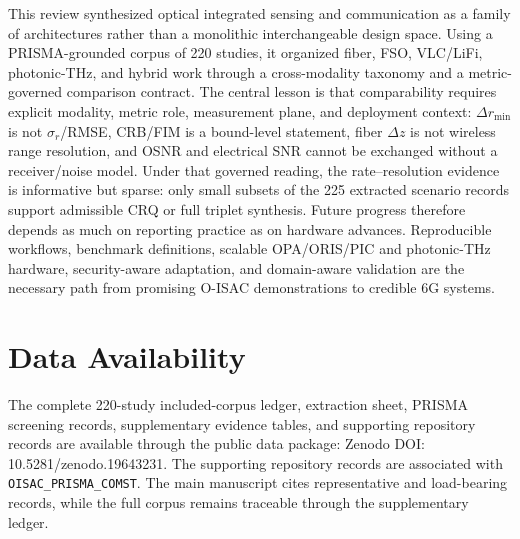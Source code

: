 \documentclass[letterpaper,journal]{IEEEtran}
\begin{document}
This review synthesized optical integrated sensing and communication as a family of architectures rather than a monolithic interchangeable design space. Using a PRISMA-grounded corpus of 220 studies, it organized fiber, FSO, VLC/LiFi, photonic-THz, and hybrid work through a cross-modality taxonomy and a metric-governed comparison contract. The central lesson is that comparability requires explicit modality, metric role, measurement plane, and deployment context: \(\Delta r_{\min}\) is not \(\sigma_r\)/RMSE, CRB/FIM is a bound-level statement, fiber \(\Delta z\) is not wireless range resolution, and OSNR and electrical SNR cannot be exchanged without a receiver/noise model. Under that governed reading, the rate--resolution evidence is informative but sparse: only small subsets of the 225 extracted scenario records support admissible CRQ or full triplet synthesis. Future progress therefore depends as much on reporting practice as on hardware advances. Reproducible workflows, benchmark definitions, scalable OPA/ORIS/PIC and photonic-THz hardware, security-aware adaptation, and domain-aware validation are the necessary path from promising O-ISAC demonstrations to credible 6G systems.

\section*{Data Availability}
The complete 220-study included-corpus ledger, extraction sheet, PRISMA screening records, supplementary evidence tables, and supporting repository records are available through the public data package: Zenodo DOI: 10.5281/zenodo.19643231. The supporting repository records are associated with \texttt{OISAC\_PRISMA\_COMST}. The main manuscript cites representative and load-bearing records, while the full corpus remains traceable through the supplementary ledger.









\end{document}
